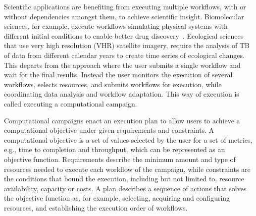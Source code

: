 Scientific applications are benefiting from executing multiple workflows, with or without dependencies amongst them, to achieve scientific insight.
Biomolecular sciences, for example, execute workflows simulating physical systems with different initial conditions to enable better drug discovery~\cite{dakka2018concurrent}.
Ecological sciences that use very high resolution (VHR) satellite imagery, require the analysis of TB of data from different calendar years to create time series of ecological changes.
This departs from the approach where the user submits a single workflow and wait for the final results.
Instead the user monitors the execution of several workflows, selects resources, and submits workflows for execution, while coordinating data analysis and workflow adaptation.
This way of execution is called executing a computational campaign.

Computational campaigns enact an execution plan to allow users to achieve a computational objective under given requirements and constraints.
A computational objective is a set of values selected by the user for a set of metrics, e.g., time to completion and throughput, which can be represented as an objective function.
Requirements describe the minimum amount and type of resources needed to execute each workflow of the campaign, while constraints are the conditions that bound the execution, including but not limited to, resource availability, capacity or costs.
A plan describes a sequence of actions that solves the objective function as, for example, selecting, acquiring and configuring resources, and establishing the execution order of workflows.


